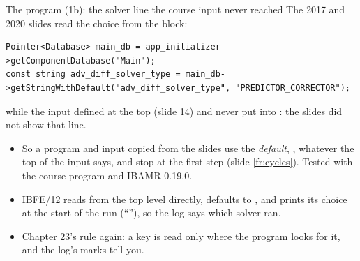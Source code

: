 \documentclass[aspectratio=169,11pt]{beamer}
\begin{document}
\begin{frame}[fragile]{The program (1b): the solver line the course input never reached}
\label{fr:code1b}
\footnotesize
The 2017 and 2020 slides read the choice from the  block:
\begin{lstlisting}[style=cpptiny]
Pointer<Database> main_db = app_initializer->getComponentDatabase("Main");
const string adv_diff_solver_type = main_db->getStringWithDefault("adv_diff_solver_type", "PREDICTOR_CORRECTOR");
\end{lstlisting}
while the input defined  at the top (slide 14) and never put  into : the slides did not show that line.
\begin{itemize}
  \item So a program and input copied from the slides use the \emph{default}, , whatever the top of the input says, and stop at the first step (slide \ref{fr:cycles}). Tested with the course program and IBAMR 0.19.0.
  \item IBFE/12 reads  from the top level directly, defaults to , and prints its choice at the start of the run (``''), so the log says which solver ran.
  \item Chapter 23's rule again: a key is read only where the program looks for it, and the log's  marks tell you.
\end{itemize}
\end{frame}
\end{document}
